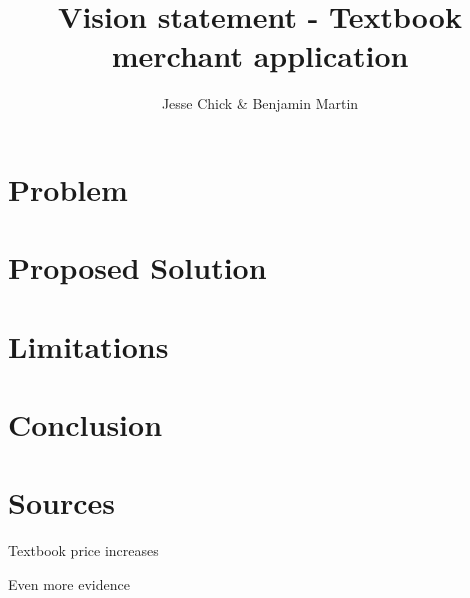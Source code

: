 \documentclass[12pt]{article}
\title{Vision statement - Textbook merchant application}
\author{Jesse Chick \& Benjamin Martin}
\begin{document}
\maketitle
\tableofcontents



\section{Problem}



\section{Proposed Solution}


\section{Limitations}


\section{Conclusion}


\section{Sources}
Textbook price increases~\cite{bookhuff}

Even more evidence~\cite{booknbc}




\end{document}
